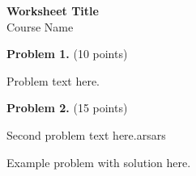 \documentclass[11pt,a4paper]{article}
\newenvironment{problem}[2][10]
{\vspace{3mm}\noindent\textbf{Problem #2.} (#1 points)\par}
{\vspace{5mm}}
\begin{document}
\begin{center}
\Large\textbf{Worksheet Title}\\
\vspace{2mm}
\large Course Name
\end{center}

\begin{problem}{1}
Problem text here.
\end{problem}

\begin{problem}[15]{2}
Second problem text here.arsars
\vspace{2cm}
\end{problem}

\begin{example}
Example problem with solution here.
\end{example}
\end{document}
